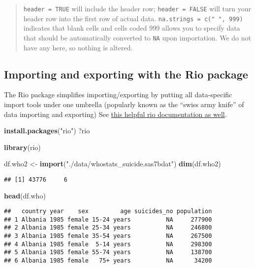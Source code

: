 \documentclass[]{article}
\newenvironment{Shaded}{\begin{snugshade}}{\end{snugshade}}
\newcommand{\KeywordTok}[1]{\textcolor[rgb]{0.13,0.29,0.53}{\textbf{#1}}}
\newcommand{\StringTok}[1]{\textcolor[rgb]{0.31,0.60,0.02}{#1}}
\newcommand{\NormalTok}[1]{#1}
\begin{document}
\begin{quote}
\texttt{header\ =\ TRUE} will include the header row;
\texttt{header\ =\ FALSE} will turn your header row into the first row
of actual data. \texttt{na.strings\ =\ c("\ ",\ 999)} indicates that
blank cells and cells coded 999 allows you to specify data that should
be automatically converted to \texttt{NA} upon importation. We do not
have any here, so nothing is altered.
\end{quote}

\subsection{Importing and exporting with the Rio
package}\label{importing-and-exporting-with-the-rio-package}

The Rio package simplifies importing/exporting by putting all
data-specific import tools under one umbrella (popularly known as the
``swiss army knife'' of data importing and exporting) See
\href{https://cran.r-project.org/web/packages/rio/vignettes/rio.html}{this
helpful rio documentation as well}.

\begin{Shaded}
\begin{Highlighting}[]
\KeywordTok{install.packages}\NormalTok{(}\StringTok{"rio"}\NormalTok{)}
\NormalTok{?rio}
\end{Highlighting}
\end{Shaded}

\begin{Shaded}
\begin{Highlighting}[]
\KeywordTok{library}\NormalTok{(rio)}

\NormalTok{df.who2 <-}\StringTok{ }\KeywordTok{import}\NormalTok{(}\StringTok{"./data/whostats_suicide.sas7bdat"}\NormalTok{)}
 \KeywordTok{dim}\NormalTok{(df.who2)}
\end{Highlighting}
\end{Shaded}

\begin{verbatim}
## [1] 43776     6
\end{verbatim}

\begin{Shaded}
\begin{Highlighting}[]
 \KeywordTok{head}\NormalTok{(df.who)}
\end{Highlighting}
\end{Shaded}

\begin{verbatim}
##   country year    sex         age suicides_no population
## 1 Albania 1985 female 15-24 years          NA     277900
## 2 Albania 1985 female 25-34 years          NA     246800
## 3 Albania 1985 female 35-54 years          NA     267500
## 4 Albania 1985 female  5-14 years          NA     298300
## 5 Albania 1985 female 55-74 years          NA     138700
## 6 Albania 1985 female   75+ years          NA      34200
\end{verbatim}
\end{document}
